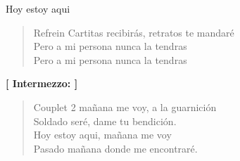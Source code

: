 \begin{song}{Hoy estoy aqui}
\begin{verse}{Refrein}
Cartitas recibir\'{a}s, \hspace{5em} retratos te mandar\'{e} \\
Pero a mi persona nunca la tendras\\
Pero a mi persona nunca la tendras\hspace{1.5em}\hspace{1.5em}
\end{verse}
\textbf{[ Intermezzo: ]}\\
\begin{verse}{Couplet 2}
ma\~{n}ana me voy, a la guarnici\'{o}n\\
Soldado ser\'{e}, dame tu bendici\'{o}n.\\
Hoy estoy aqui, ma\~{n}ana me voy\\
Pasado ma\~{n}ana donde me encontrar\'{e}.\hspace{4em}\hspace{4em}\\
\end{verse}

\end{song}